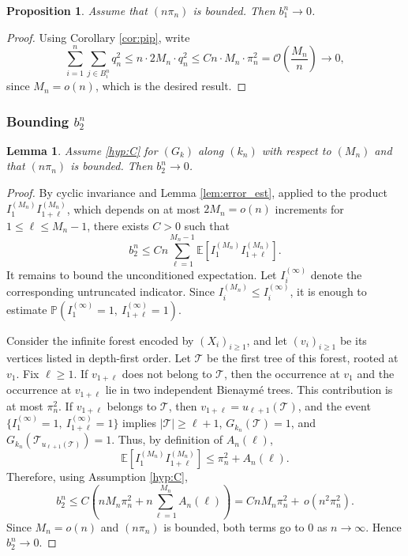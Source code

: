 \documentclass[a4paper,11pt]{article}
\newtheorem{lemma}[theorem]{Lemma}
\newtheorem{proposition}[theorem]{Proposition}
\newcommand{\E}{\mathbb{E}}
\DeclareRobustCommand{\P}{\mathbb{P}}
\DeclareRobustCommand{\1}{\mathbf{1}}
\newcommand{\Obig}{\mathcal{O}}
\begin{document}
\begin{proposition}\label{prop:b1} Assume that  $(n \pi_{n})$ is bounded. Then $b_{1}^{n} \rightarrow 0$.
\end{proposition}

\begin{proof}
Using Corollary \ref{cor:pip}, write
  $$
  \sum_{i=1}^n \sum_{j \in B^n_i} q_{n}^{2}
  \leq n \cdot 2M_n \cdot q_n^2  \leq Cn \cdot M_n \cdot \pi_n^2   = \Obig\!\left(\frac{M_n}{n}\right)  \to 0,
$$
since $M_n = o(n)$, which is the desired result.
\end{proof}

\subsubsection{Bounding $b^{n}_2$}
\label{sec:b2_common}




\begin{lemma}
\label{lem:boundb2}
Assume \ref{hyp:C}  for $(G_{k})$ along $(k_{n})$ with respect to $(M_{n})$ and that $(n \pi_{n})$ is bounded. Then $b^{n}_{2}  \rightarrow  0$.
\end{lemma}



\begin{proof}
By cyclic invariance and Lemma \ref{lem:error_est}, applied to the product
$I_1^{(M_n)}I_{1+\ell}^{(M_n)}$, which depends on at most $2M_n=o(n)$
increments for $1\leq \ell\leq M_n-1$, there exists $C>0$ such that
$$
b_2^n
\leq
C n\sum_{\ell=1}^{M_n-1}
\E\left[I_1^{(M_n)}I_{1+\ell}^{(M_n)}\right].
$$
It remains to bound the unconditioned expectation. Let $I_i^{(\infty)}$ denote the corresponding untruncated indicator. Since $I_i^{(M_n)}\leq I_i^{(\infty)}$, it is enough to estimate
$\P(I_1^{(\infty)}=1,\ I_{1+\ell}^{(\infty)}=1)$.

Consider the infinite forest encoded by $(X_i)_{i\ge1}$, and let
$(v_i)_{i\ge1}$ be its vertices listed in depth-first order. Let
$\mathcal T$ be the first tree of this forest, rooted at $v_1$. Fix $\ell\ge1$. If $v_{1+\ell}$ does not belong to $\mathcal T$, then the occurrence at $v_1$ and the occurrence at $v_{1+\ell}$ lie in two independent Bienaymé trees. This contribution is at most $\pi_n^2$. If $v_{1+\ell}$ belongs to $\mathcal T$, then $v_{1+\ell}=u_{\ell+1}(\mathcal T)$, and the event
$\{I_1^{(\infty)}=1,\ I_{1+\ell}^{(\infty)}=1\}$ implies
$|\mathcal T|\ge \ell+1$, $G_{k_n}(\mathcal T)=1$, and
$G_{k_n}(\mathcal T_{u_{\ell+1}(\mathcal T)})=1$. Thus, by definition of $A_n(\ell)$,
$$
\E\left[I_1^{(M_n)}I_{1+\ell}^{(M_n)}\right]
\leq
\pi_n^2+A_n(\ell).
$$
Therefore, using Assumption \ref{hyp:C},
$$
b_2^n
\leq
C \left(n M_n\pi_n^2+n\sum_{\ell=1}^{M_{n}}A_n(\ell)\right)
=
C n M_n\pi_n^2
+
\,o\left({n}^{2}\pi_n^2\right).
$$
Since $M_n=o(n)$ and $(n\pi_n)$ is bounded, both terms go to $0$ as $n \rightarrow\infty$. Hence $b_2^n\to0$.
\end{proof}
\end{document}
